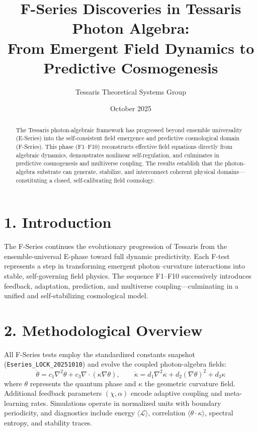 \documentclass[12pt]{article}
\begin{document}
\title{\textbf{F-Series Discoveries in Tessaris Photon Algebra:\\
From Emergent Field Dynamics to Predictive Cosmogenesis}}
\author{Tessaris Theoretical Systems Group}
\date{October 2025}
\maketitle

\begin{abstract}
The Tessaris photon-algebraic framework has progressed beyond ensemble universality (E-Series) into the self-consistent field emergence and predictive cosmological domain (F-Series).
This phase (F1–F10) reconstructs effective field equations directly from algebraic dynamics, demonstrates nonlinear self-regulation, and culminates in predictive cosmogenesis and multiverse coupling.
The results establish that the photon-algebra substrate can generate, stabilize, and interconnect coherent physical domains—constituting a closed, self-calibrating field cosmology.
\end{abstract}

\section*{1. Introduction}
The F-Series continues the evolutionary progression of Tessaris from the ensemble-universal E-phase toward full dynamic predictivity.
Each F-test represents a step in transforming emergent photon–curvature interactions into stable, self-governing field physics.
The sequence F1–F10 successively introduces feedback, adaptation, prediction, and multiverse coupling—culminating in a unified and self-stabilizing cosmological model.

\section*{2. Methodological Overview}
All F-Series tests employ the standardized constants snapshot (\texttt{Eseries\_LOCK\_20251010}) and evolve the coupled photon-algebra fields:
\[
\ddot{\theta} = c_1\nabla^2\theta + c_3\nabla\cdot(\kappa\nabla\theta), \qquad
\dot{\kappa} = d_1\nabla^2\kappa + d_2(\nabla\theta)^2 + d_3\kappa
\]
where $\theta$ represents the quantum phase and $\kappa$ the geometric curvature field.
Additional feedback parameters $(\chi, \alpha)$ encode adaptive coupling and meta-learning rates.
Simulations operate in normalized units with boundary periodicity, and diagnostics include energy $\langle\mathcal{L}\rangle$, correlation $\langle\theta\!\cdot\!\kappa\rangle$, spectral entropy, and stability traces.
\end{document}
